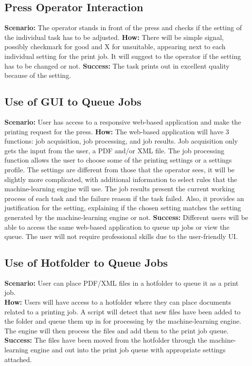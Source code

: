 \documentclass[onecolumn, draftclsnofoot,10pt, compsoc]{IEEEtran}
\begin{document}
\subsection{Press Operator Interaction}
\textbf{Scenario:} The operator stands in front of the press and checks if the setting of the individual task has to be adjusted.\newline
\textbf{How:} There will be simple signal, possibly checkmark for good and X for unsuitable, appearing next to each individual setting for the print job. It will suggest to the operator if the setting has to be changed or not.\newline
\textbf{Success:} The task prints out in excellent quality because of the setting.

\subsection{Use of GUI to Queue Jobs}
\textbf{Scenario:} User has access to a responsive web-based application and make the printing request for the press.\newline
\textbf{How:} The web-based application will have 3 functions: job acquisition, job processing, and job results. Job acquisition only gets the input from the user, a PDF and/or XML file. The job processing function allows the user to choose some of the printing settings or a settings profile. The settings are different from those that the operator sees, it will be slightly more complicated, with additional information to select rules that the machine-learning engine will use. The job results present the current working process of each task and the failure reason if the task failed. Also, it provides an justification for the setting, explaining if the chosen setting matches the setting generated by the machine-learning engine or not. \newline
\textbf{Success:} Different users will be able to access the same web-based application to queue up jobs or view the queue. The user will not require professional skills due to the user-friendly UI.

\subsection{Use of Hotfolder to Queue Jobs}
\textbf{Scenario:} User can place PDF/XML files in a hotfolder to queue it as a print job.\\
\textbf{How:} Users will have access to a hotfolder where they can place documents related to a printing job. A script will detect that new files have been added to the folder and queue them up in for processing by the machine-learning engine. The engine will then process the files and add them to the print job queue.\\
\textbf{Success:} The files have been moved from the hotfolder through the machine-learning engine and out into the print job queue with appropriate settings attached.
\end{document}
